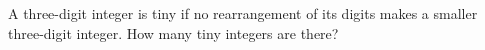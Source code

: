 A three-digit integer is tiny if no rearrangement of its digits makes a smaller three-digit integer. How many tiny integers are there?
